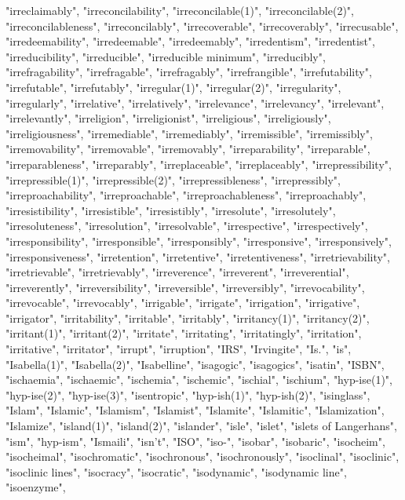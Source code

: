 "irreclaimably",
"irreconcilability",
"irreconcilable(1)",
"irreconcilable(2)",
"irreconcilableness",
"irreconcilably",
"irrecoverable",
"irrecoverably",
"irrecusable",
"irredeemability",
"irredeemable",
"irredeemably",
"irredentism",
"irredentist",
"irreducibility",
"irreducible",
"irreducible minimum",
"irreducibly",
"irrefragability",
"irrefragable",
"irrefragably",
"irrefrangible",
"irrefutability",
"irrefutable",
"irrefutably",
"irregular(1)",
"irregular(2)",
"irregularity",
"irregularly",
"irrelative",
"irrelatively",
"irrelevance",
"irrelevancy",
"irrelevant",
"irrelevantly",
"irreligion",
"irreligionist",
"irreligious",
"irreligiously",
"irreligiousness",
"irremediable",
"irremediably",
"irremissible",
"irremissibly",
"irremovability",
"irremovable",
"irremovably",
"irreparability",
"irreparable",
"irreparableness",
"irreparably",
"irreplaceable",
"irreplaceably",
"irrepressibility",
"irrepressible(1)",
"irrepressible(2)",
"irrepressibleness",
"irrepressibly",
"irreproachability",
"irreproachable",
"irreproachableness",
"irreproachably",
"irresistibility",
"irresistible",
"irresistibly",
"irresolute",
"irresolutely",
"irresoluteness",
"irresolution",
"irresolvable",
"irrespective",
"irrespectively",
"irresponsibility",
"irresponsible",
"irresponsibly",
"irresponsive",
"irresponsively",
"irresponsiveness",
"irretention",
"irretentive",
"irretentiveness",
"irretrievability",
"irretrievable",
"irretrievably",
"irreverence",
"irreverent",
"irreverential",
"irreverently",
"irreversibility",
"irreversible",
"irreversibly",
"irrevocability",
"irrevocable",
"irrevocably",
"irrigable",
"irrigate",
"irrigation",
"irrigative",
"irrigator",
"irritability",
"irritable",
"irritably",
"irritancy(1)",
"irritancy(2)",
"irritant(1)",
"irritant(2)",
"irritate",
"irritating",
"irritatingly",
"irritation",
"irritative",
"irritator",
"irrupt",
"irruption",
"IRS",
"Irvingite",
"Is.",
"is",
"Isabella(1)",
"Isabella(2)",
"Isabelline",
"isagogic",
"isagogics",
"isatin",
"ISBN",
"ischaemia",
"ischaemic",
"ischemia",
"ischemic",
"ischial",
"ischium",
"hyp-ise(1)",
"hyp-ise(2)",
"hyp-ise(3)",
"isentropic",
"hyp-ish(1)",
"hyp-ish(2)",
"isinglass",
"Islam",
"Islamic",
"Islamism",
"Islamist",
"Islamite",
"Islamitic",
"Islamization",
"Islamize",
"island(1)",
"island(2)",
"islander",
"isle",
"islet",
"islets of Langerhans",
"ism",
"hyp-ism",
"Ismaili",
"isn't",
"ISO",
"iso-",
"isobar",
"isobaric",
"isocheim",
"isocheimal",
"isochromatic",
"isochronous",
"isochronously",
"isoclinal",
"isoclinic",
"isoclinic lines",
"isocracy",
"isocratic",
"isodynamic",
"isodynamic line",
"isoenzyme",

